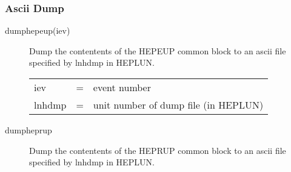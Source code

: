 \subsubsection{Ascii Dump}

\begin{description}

\item[dumphepeup(iev)]
 Dump the contentents of the HEPEUP common block to an ascii file 
 specified by lnhdmp in HEPLUN.

\begin{tabular}{lcl}
iev & = & event number \\
lnhdmp & = & unit number of dump file (in HEPLUN) \\
\end{tabular}

\item[dumpheprup]
 Dump the contentents of the HEPRUP common block to an ascii file
 specified by lnhdmp in HEPLUN.

\end{description}



